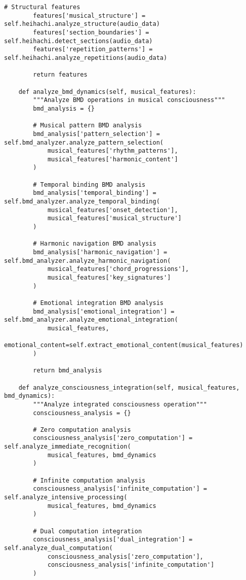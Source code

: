 \documentclass[12pt,a4paper]{article}
\begin{document}
\begin{lstlisting}[style=pythonstyle, caption=Complete Musical Consciousness Analysis]
        # Structural features
        features['musical_structure'] = self.heihachi.analyze_structure(audio_data)
        features['section_boundaries'] = self.heihachi.detect_sections(audio_data)
        features['repetition_patterns'] = self.heihachi.analyze_repetitions(audio_data)
        
        return features
    
    def analyze_bmd_dynamics(self, musical_features):
        """Analyze BMD operations in musical consciousness"""
        bmd_analysis = {}
        
        # Musical pattern BMD analysis
        bmd_analysis['pattern_selection'] = self.bmd_analyzer.analyze_pattern_selection(
            musical_features['rhythm_patterns'],
            musical_features['harmonic_content']
        )
        
        # Temporal binding BMD analysis
        bmd_analysis['temporal_binding'] = self.bmd_analyzer.analyze_temporal_binding(
            musical_features['onset_detection'],
            musical_features['musical_structure']
        )
        
        # Harmonic navigation BMD analysis
        bmd_analysis['harmonic_navigation'] = self.bmd_analyzer.analyze_harmonic_navigation(
            musical_features['chord_progressions'],
            musical_features['key_signatures']
        )
        
        # Emotional integration BMD analysis
        bmd_analysis['emotional_integration'] = self.bmd_analyzer.analyze_emotional_integration(
            musical_features,
            emotional_content=self.extract_emotional_content(musical_features)
        )
        
        return bmd_analysis
    
    def analyze_consciousness_integration(self, musical_features, bmd_dynamics):
        """Analyze integrated consciousness operation"""
        consciousness_analysis = {}
        
        # Zero computation analysis
        consciousness_analysis['zero_computation'] = self.analyze_immediate_recognition(
            musical_features, bmd_dynamics
        )
        
        # Infinite computation analysis  
        consciousness_analysis['infinite_computation'] = self.analyze_intensive_processing(
            musical_features, bmd_dynamics
        )
        
        # Dual computation integration
        consciousness_analysis['dual_integration'] = self.analyze_dual_computation(
            consciousness_analysis['zero_computation'],
            consciousness_analysis['infinite_computation']
        )
        

\end{lstlisting}
\end{document}
